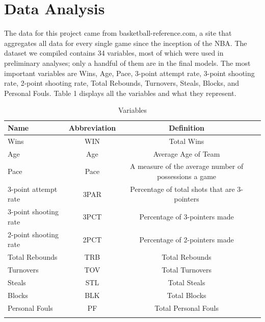 \documentclass[12pt]{article}
\begin{document}
\section{Data Analysis}
The data for this project came from basketball-reference.com, a site that aggregates all data for every single game since the inception of the NBA. The dataset we compiled contains 34 variables, most of which were used in preliminary analyses; only a handful of them are in the final models. The most important variables are Wins, Age, Pace, 3-point attempt rate, 3-point shooting rate, 2-point shooting rate, Total Rebounds, Turnovers, Steals, Blocks, and Personal Fouls. Table 1 displays all the variables and what they represent. \par

 \begin{table}[ht]
\def\tablename{Table}
\caption{Variables}
\centering
\begin{tabular}{lccc}
\\
\hline 
Name & Abbreviation  &  Definition   \\
\hline
Wins & WIN & Total Wins\\
Age & Age & Average Age of Team\\
Pace & Pace & A measure of the average number of possessions a game\\
3-point attempt rate & 3PAR & Percentage of total shots that are 3-pointers\\
3-point shooting rate & 3PCT & Percentage of 3-pointers made \\
2-point shooting rate & 2PCT & Percentage of 2-pointers made \\
Total Rebounds & TRB & Total Rebounds\\
Turnovers  & TOV & Total Turnovers\\
Steals & STL & Total Steals\\
Blocks & BLK & Total Blocks\\
Personal Fouls & PF & Total Personal Fouls\\
\\

\end{tabular}
\\ 
\end{table}
\end{document}

